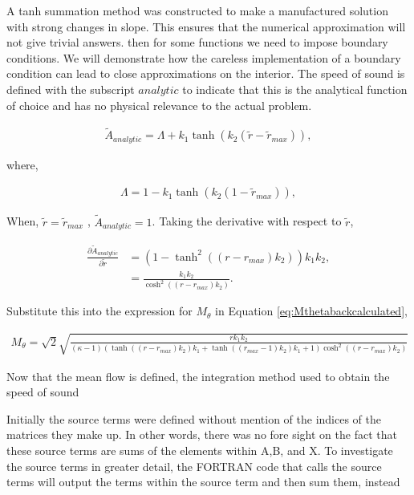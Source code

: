 \documentclass[a4paper]{report}
\begin{document}
A tanh summation method was constructed to make a manufactured solution with 
strong changes in slope. This ensures that the numerical approximation will not 
give trivial answers. 
then for some functions we need to impose boundary conditions. We will demonstrate
how the careless implementation of a boundary condition can lead to close approximations
on the interior.  The speed of sound is defined with the subscript $analytic$ to indicate that this is the analytical function of choice and has no physical relevance 
to the actual problem.

\begin{align*}
\widetilde{A}_{analytic} = \Lambda + k_1 \tanh \left( k_2 \left( \widetilde{r} - \widetilde{r}_{max} \right) \right),
\end{align*}

where, 

\begin{align*}
    \Lambda = 1 - k_1 \tanh(k_2 (1 - \widetilde{r}_{max})),
\end{align*}

When, $\widetilde{r}=\widetilde{r}_{max}$ , $\widetilde{A}_{analytic} = 1$.  
Taking the derivative with respect to $\widetilde{r}$,

\begin{align*}
    \frac{\partial \widetilde{A}_{analytic} }{\partial \widetilde{r}} &=
    \left(1 - \tanh^{2}{\left(\left(r - r_{max}\right) {k}_{2} \right)}\right) {k}_{1} {k}_{2}, \\ 
    &= \frac{ k_{1} k_{2}}{\cosh^{2}{\left(\left(r - r_{max}\right) {k}_{2} \right)}}.
\end{align*}

Substitute this into the expression for $M_{\theta}$ in Equation 
\ref{eq:Mthetabackcalculated},

\begin{align*}
    M_{\theta} = \sqrt{2}
    \sqrt{\frac{r {k}_{1} {k}_{2}}{\left(\kappa - 1\right) \left(\tanh{\left(\left(r - r_{max}\right) {k}_{2} \right)} {k}_{1} + \tanh{\left(\left(r_{max} - 1\right) {k}_{2} \right)} {k}_{1} + 1\right) \cosh^{2}{\left(\left(r - r_{max}\right) {k}_{2} \right)}}}
\end{align*} 

Now that the mean flow is defined, the integration method used to obtain the 
speed of sound


Initially the source terms were defined without mention of the indices of the 
matrices they make up. In other words, there was no fore sight on the fact that
these source terms are sums of the elements within A,B, and X. To investigate 
the source terms in greater detail, the FORTRAN code that calls the source 
terms will output the terms within the source term and then sum them, instead 
\end{document}

